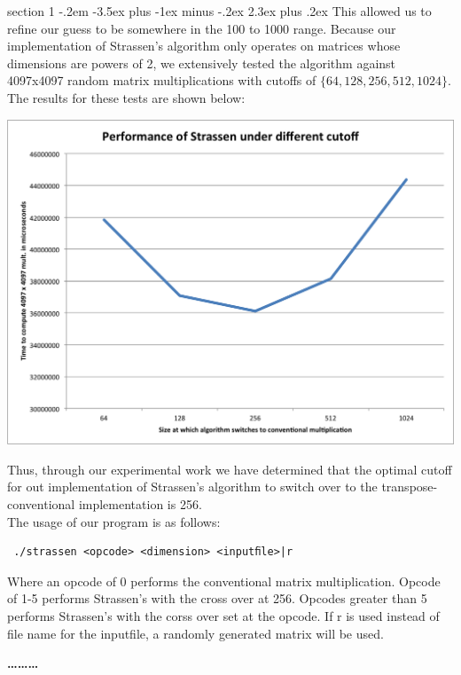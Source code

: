 \documentclass[12pt]{article}
\makeatletter
\newenvironment{problem}{\@startsection
       {section}
       {1}
       {-.2em}
       {-3.5ex plus -1ex minus -.2ex}
       {2.3ex plus .2ex}
       {\pagebreak[3]%
       \large\bf\noindent{Problem }
       }
       }
       {%
       \begin{center}\large\bf \ldots\ldots\ldots\end{center}}
\makeatother
\begin{document}
\begin{problem}{}
\noindent This allowed us to refine our guess to be somewhere in the 100 to 1000 range.  Because our implementation of Strassen's algorithm only operates on matrices whose dimensions are powers of 2, we extensively tested the algorithm against 4097x4097 random matrix multiplications with cutoffs of $\{64, 128, 256, 512, 1024\}$.  The results for these tests are shown below:
\begin{center}
\includegraphics[scale=0.75]{figs/benchmark-2.png}
\end{center}

\noindent Thus, through our experimental work we have determined that
the optimal cutoff for out implementation of Strassen's algorithm to
switch over to the transpose-conventional implementation is 256.\\

\noindent The usage of our program is as follows:
\begin{verbatim}
 ./strassen <opcode> <dimension> <inputﬁle>|r
\end{verbatim}
Where an opcode of 0 performs the conventional matrix
multiplication. Opcode of 1-5 performs Strassen's with the cross over
at 256. Opcodes greater than 5 performs Strassen's with the corss over
set at the opcode. If r is used instead of file name for the
inputfile, a randomly generated matrix will be used.


\end{problem}{}
\end{document}
